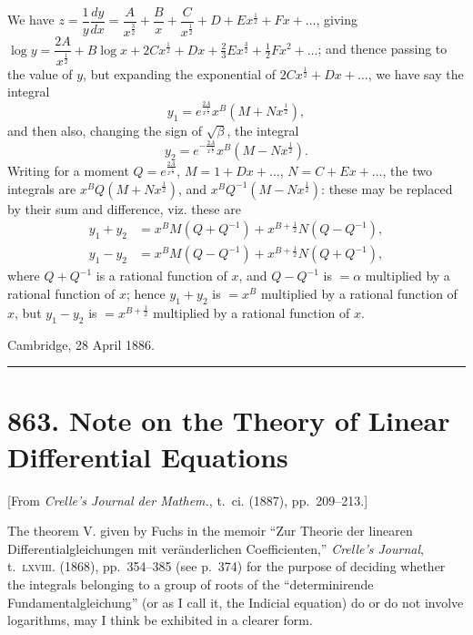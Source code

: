 \documentclass[11pt,a4paper]{book}
\begin{document}
We have $z = \dfrac{1}{y}\dfrac{dy}{dx} = \dfrac{A}{x^{\frac{3}{2}}} + \dfrac{B}{x} + \dfrac{C}{x^{\frac{1}{2}}} + D + Ex^{\frac{1}{2}} + Fx + \ldots$, giving $\log y = \dfrac{2A}{x^{\frac{1}{2}}} + B\log x + 2Cx^{\frac{1}{2}} + Dx + \tfrac{2}{3}Ex^{\frac{3}{2}} + \tfrac{1}{2}Fx^2 + \ldots$; and thence passing to the value of $y$, but expanding the exponential of $2Cx^{\frac{1}{2}} + Dx + \ldots$, we have say the integral
\[
y_1 = e^{\frac{2A}{x^{\frac{1}{2}}}} x^B (M + Nx^{\frac{1}{2}}),
\]
and then also, changing the sign of $\sqrt{\beta}$, the integral
\[
y_2 = e^{-\frac{2A}{x^{\frac{1}{2}}}} x^B (M - Nx^{\frac{1}{2}}).
\]
Writing for a moment $Q = e^{\frac{2A}{x^{\frac{1}{2}}}}$, $M = 1 + Dx + \ldots$, $N = C + Ex + \ldots$, the two integrals are $x^B Q(M + Nx^{\frac{1}{2}})$, and $x^B Q^{-1}(M - Nx^{\frac{1}{2}})$: these may be replaced by their sum and difference, viz. these are
\begin{align*}
y_1 + y_2 &= x^B M(Q + Q^{-1}) + x^{B + \frac{1}{2}} N(Q - Q^{-1}), \\
y_1 - y_2 &= x^B M(Q - Q^{-1}) + x^{B + \frac{1}{2}} N(Q + Q^{-1}),
\end{align*}
where $Q + Q^{-1}$ is a rational function of $x$, and $Q - Q^{-1}$ is $= \alpha$ multiplied by a rational function of $x$; hence $y_1 + y_2$ is $= x^B$ multiplied by a rational function of $x$, but $y_1 - y_2$ is $= x^{B + \frac{1}{2}}$ multiplied by a rational function of $x$.

\begin{flushright}
Cambridge, 28 April 1886.
\end{flushright}

\vspace{12pt}
\hrule
\vspace{12pt}

\section*{863. Note on the Theory of Linear Differential Equations}

\begin{center}
[From \textit{Crelle's Journal der Mathem.}, t.~ci. (1887), pp.~209--213.]
\end{center}

The theorem V. given by Fuchs in the memoir ``Zur Theorie der linearen Differentialgleichungen mit ver\"anderlichen Coefficienten,'' \textit{Crelle's Journal}, t.~\textsc{lxviii}. (1868), pp.~354--385 (see p.~374) for the purpose of deciding whether the integrals belonging to a group of roots of the ``determinirende Fundamentalgleichung'' (or as I call it, the Indicial equation) do or do not involve logarithms, may I think be exhibited in a clearer form.
\end{document}
